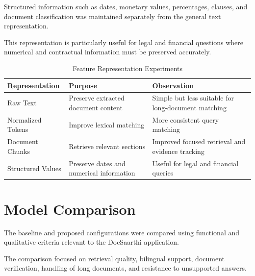 Structured information such as dates, monetary values, percentages,
clauses, and document classification was maintained separately from
the general text representation.

This representation is particularly useful for legal and financial
questions where numerical and contractual information must be
preserved accurately.

\begin{table}[H]
\centering
\caption{Feature Representation Experiments}
\begin{tabular}{|p{4cm}|p{5cm}|p{4cm}|}
\hline
\textbf{Representation} & \textbf{Purpose} & \textbf{Observation} \\
\hline
Raw Text & Preserve extracted document content & Simple but less suitable for long-document matching \\
\hline
Normalized Tokens & Improve lexical matching & More consistent query matching \\
\hline
Document Chunks & Retrieve relevant sections & Improved focused retrieval and evidence tracking \\
\hline
Structured Values & Preserve dates and numerical information & Useful for legal and financial queries \\
\hline
\end{tabular}
\end{table}

\section{Model Comparison}

The baseline and proposed configurations were compared using
functional and qualitative criteria relevant to the DocSaarthi
application.

The comparison focused on retrieval quality, bilingual support,
document verification, handling of long documents, and resistance to
unsupported answers.

